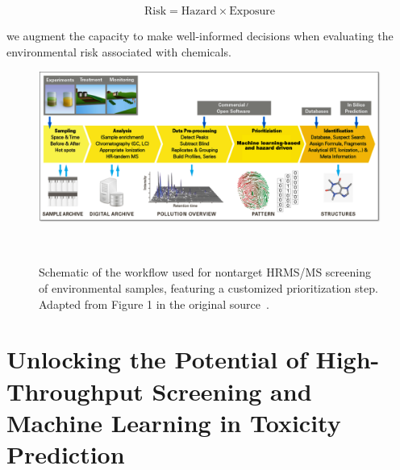 \begin{equation}
    \text{Risk} = \text{Hazard} \times \text{Exposure}
\end{equation}

we augment the capacity to make well-informed decisions when evaluating the environmental risk associated with chemicals.

 
\begin{figure}[htbp]  %
    \centering
    \includegraphics[width=1.0\textwidth]{figures/non_target_high_resolution_mass_spectrometry.png}  
    \caption{Schematic of the workflow used for nontarget HRMS/MS screening of environmental samples, featuring a customized prioritization step. Adapted from Figure 1 in the original source~\cite{hollender}.}
~\label{fig:non_target_high_resolution_mass_spectrometry} 
\end{figure}

\section{Unlocking the Potential of High-Throughput Screening and Machine Learning in Toxicity Prediction}

